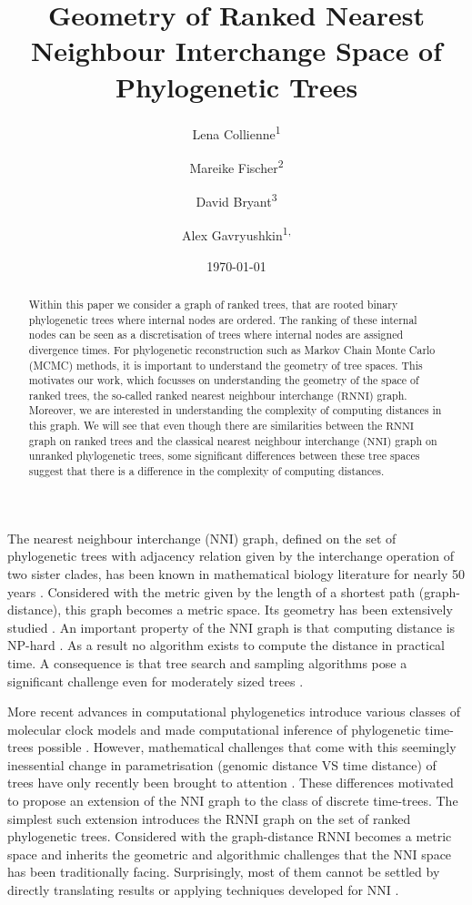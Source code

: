\documentclass{amsart}
\title[Ranked Nearest Neighbour Intarchange]{Geometry of Ranked Nearest Neighbour Interchange Space of Phylogenetic Trees}
\date{\today}
\author{Lena Collienne\textsuperscript{1}}
\author{Mareike Fischer\textsuperscript{2}}
\author{David Bryant\textsuperscript{3}}
\author{Alex Gavryushkin\textsuperscript{1, \Letter}}
\newcommand{\nni}{\mathrm{NNI}}
\newcommand{\rnni}{\mathrm{RNNI}}
\begin{document}
\begin{abstract}
Within this paper we consider a graph of ranked trees, that are rooted binary phylogenetic trees where internal nodes are ordered.
The ranking of these internal nodes can be seen as a discretisation of trees where internal nodes are assigned divergence times.
For phylogenetic reconstruction such as Markov Chain Monte Carlo (MCMC) methods, it is important to understand the geometry of tree spaces.
This motivates our work, which focusses on understanding the geometry of the space of ranked trees, the so-called ranked nearest neighbour interchange ($\rnni$) graph.
Moreover, we are interested in understanding the complexity of computing distances in this graph.
We will see that even though there are similarities between the $\rnni$ graph on ranked trees and the classical nearest neighbour interchange ($\nni$) graph on unranked phylogenetic trees, some significant differences between these tree spaces suggest that there is a difference in the complexity of computing distances.
\end{abstract}

\maketitle

The nearest neighbour interchange ($\nni$) graph, defined on the set of phylogenetic trees with adjacency relation given by the interchange operation of two sister clades, has been known in mathematical biology literature for nearly 50 years \autocite{Robinson1971-ql,Moore1973-kk}.
Considered with the metric given by the length of a shortest path (graph-distance), this graph becomes a metric space.
Its geometry has been extensively studied \autocite{Dasgupta2000-xa, Li1996-zw, Gordon2013-fw, De_Jong2016-al}.
An important property of the $\nni$ graph is that computing distance is NP-hard \autocite{Dasgupta2000-xa}.
As a result no algorithm exists to compute the distance in practical time.
A consequence is that tree search and sampling algorithms pose a significant challenge even for moderately sized trees
\autocite{Whidden2016-kl}.

More recent advances in computational phylogenetics introduce various classes of molecular clock models \autocite{Yoder2000-ks,Drummond2006-nl,Drummond2010-yf} and made computational inference of phylogenetic time-trees possible \autocite{Ronquist2003-eq, Bouckaert2018-yr, Hadfield2018-xp}.
However, mathematical challenges that come with this seemingly inessential change in parametrisation (genomic distance VS time distance) of trees have only recently been brought to attention \autocite{Gavryushkin2016-uu}.
These differences motivated \textcite{Gavryushkin2018-ol} to propose an extension of the $\nni$ graph to the class of discrete time-trees.
The simplest such extension introduces the $\rnni$ graph on the set of ranked phylogenetic trees.
Considered with the graph-distance $\rnni$ becomes a metric space and inherits the geometric and algorithmic challenges that the $\nni$ space has been traditionally facing.
Surprisingly, most of them cannot be settled by directly translating results or applying techniques developed for $\nni$ \autocite{Gavryushkin2018-ol}.
\end{document}
